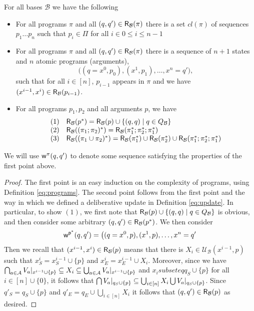 \documentclass{llncs}
\newcommand{\witness}[1]{{\sf w^{#1}}}
\newcommand{\carriers}[1]{Q_{#1}}
\newcommand{\rels}[1]{{\sf R_{#1}}}
\newcommand{\update}[3]{{\mathcal U}_{#1}(#2,#3)}
\newcommand{\views}{\mathcal B}
\begin{document}
\begin{proposition}\label{prop:prog}
For all bases $\views$ we have the following
\begin{itemize}
\item For all programs $\pi$ and all $(q,q') \in \rels \views(\pi)$  there is a set $cl(\pi)$ of sequences $p_1\ldots p_n$ such that $p_i \in \Pi$ for all $i \in 0 \leq i \leq {n-1}$
\item For all programs $\pi$ and all $(q,q') \in \rels \views(\pi)$ there is a sequence of $n+1$ states and $n$ atomic programs (arguments),
 $$\big((q=x^0,p_0),(x^1,p_1),\ldots,x^n = q'\big),$$ such that for all $i \in [n]$, $p_{i-1}$ appears in $\pi$ and we have $(x^{i-1},x^i) \in \rels \views(p_{i-1})$. %
\item For all programs $p_1,p_2$ and all arguments $p$, we have
$$
\begin{array}{ll}
(1) & \rels \views(p^\ast) = \rels \views(p) \cup \{(q,q) \mid q \in \carriers \views\} \\ 
(2) & \rels \views ((\pi_1;\pi_2)^\ast) = \rels \views (\pi_1^\ast;\pi_2^\ast;\pi_1^\ast) \\
(3) & \rels \views((\pi_1 \cup \pi_2)^\ast) = \rels \views(\pi_1^\ast) \cup \rels \views(\pi_2^\ast) \cup \rels \views (\pi_1^\ast;\pi_2^\ast;\pi_1^\ast)
\end{array}
$$
\end{itemize}
We will use $\witness \pi(q,q')$ to denote some sequence satisfying the properties of the first point above.
\end{proposition}

\begin{proof}
The first point is an easy induction on the complexity of programs, using Definition \ref{eq:programs}. The second point follows from the first point and the way in which we defined a deliberative update in Definition \ref{eq:update}. In particular, to show $(1)$, we first note that $\rels \views (p) \cup \{(q,q) \mid q \in \carriers \views\}$ is obvious, and then consider some arbitrary $(q,q') \in \rels \views (p^\ast)$. We then consider 
$$\witness {p^\ast}(q,q') = \big((q=x^0,p),(x^1,p),\ldots,x^n=q'$$
Then we recall that $(x^{i-1},x^i) \in \rels \views (p)$ means that there is $X_i \in \update \views {x^{i-1}} p$ such that $x^i_S = x^{i-1}_S \cup \{p\}$ and $x^i_E = x^{i-1}_E \cup X_i$. Moreover, since we have $\bigcap_{a \in \mathcal A} {V_a}|_{x^{i-1} \cup \{p\}} \subseteq X_i \subseteq \bigcup_{a \in \mathcal A} {V_a}|_{x^{i-1} \cup \{p\}}$ and $x_i subseteq q_S \cup \{p\}$ for all $i \in [n] \cup \{0\}$, it follows that $\bigcap {V_a}|_{q_S \cup \{p\}} \subseteq \bigcup_{i \in [n]}X_i \bigcup {V_a}|_{q_S \cup \{p\}}$. Since $q'_S = q_S \cup \{p\}$ and $q'_E = q_E \cup \bigcup_{i \in [n]}X_i$ it follows that $(q,q') \in \rels \views(p)$ as desired.

\end{proof}
\end{document}
